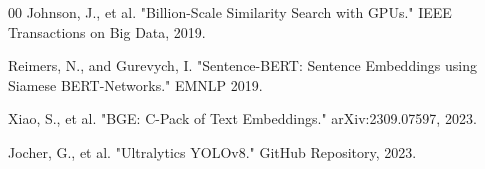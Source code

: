 \documentclass[conference]{IEEEtran}
\begin{document}
\begin{thebibliography}{00}
 Johnson, J., et al. "Billion-Scale Similarity Search with GPUs." IEEE Transactions on Big Data, 2019.

 Reimers, N., and Gurevych, I. "Sentence-BERT: Sentence Embeddings using Siamese BERT-Networks." EMNLP 2019.

 Xiao, S., et al. "BGE: C-Pack of Text Embeddings." arXiv:2309.07597, 2023.

 Jocher, G., et al. "Ultralytics YOLOv8." GitHub Repository, 2023.

\end{thebibliography}
\end{document}
